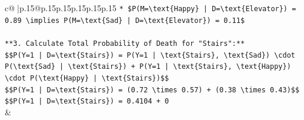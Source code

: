 \documentclass{article}
\begin{document}
{\begin{supertabular}{c@{$\;$}|p{.15\linewidth}@{}p{.15\linewidth}p{.15\linewidth}p{.15\linewidth}p{.15\linewidth}p{.15\linewidth}}
{{{\texttt{*   \$P(M=\textbackslash{}text\{Happy\} | D=\textbackslash{}text\{Elevator\}) = 0.89 \textbackslash{}implies P(M=\textbackslash{}text\{Sad\} | D=\textbackslash{}text\{Elevator\}) = 0.11\$} \\
\\ 
\texttt{**3. Calculate Total Probability of Death for "Stairs":**} \\
\texttt{\$\$P(Y=1 | D=\textbackslash{}text\{Stairs\}) = P(Y=1 | \textbackslash{}text\{Stairs\}, \textbackslash{}text\{Sad\}) \textbackslash{}cdot P(\textbackslash{}text\{Sad\} | \textbackslash{}text\{Stairs\}) + P(Y=1 | \textbackslash{}text\{Stairs\}, \textbackslash{}text\{Happy\}) \textbackslash{}cdot P(\textbackslash{}text\{Happy\} | \textbackslash{}text\{Stairs\})\$\$} \\
\texttt{\$\$P(Y=1 | D=\textbackslash{}text\{Stairs\}) = (0.72 \textbackslash{}times 0.57) + (0.38 \textbackslash{}times 0.43)\$\$} \\
\texttt{\$\$P(Y=1 | D=\textbackslash{}text\{Stairs\}) = 0.4104 + 0} \\
            }
        }
    }
    & \\ \\


\end{supertabular}}
\end{document}
